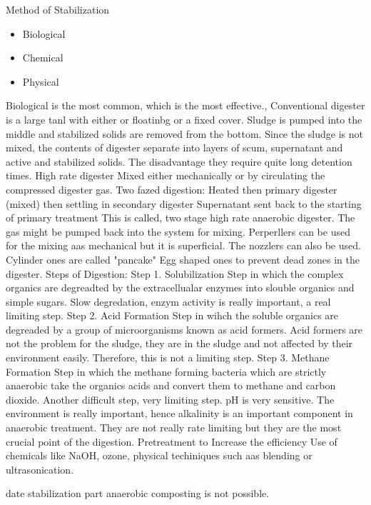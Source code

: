 \documentclass[12pt]{article}
\begin{document}
Method of Stabilization
\begin{itemize}
    \item Biological
    \item Chemical
    \item Physical
\end{itemize}
Biological is the most common, which is the most effective.,
Conventional digester  %
is a large tanl with either or floatinbg or a fixed cover. Sludge is pumped into the middle and stabilized solids are removed from the bottom. Since the sludge is not mixed, the contents of digester separate into layers of scum, supernatant and active and stabilized solids. The disadvantage they require quite long detention times.
High rate digester %
Mixed either mechanically or by circulating the compressed digester gas.
Two fazed digestion:
Heated then primary digester (mixed) then settling in secondary digester
Supernatant sent back to the starting of primary treatment
This is called, two stage high rate anaerobic digester.
The gas might be pumped back into the system for mixing.
Perperllers can be used for the mixing aas mechanical but it is superficial.
The nozzlers can also be used.
Cylinder ones are called "pancake"
Egg shaped ones to prevent dead zones in the digester.
Steps of Digestion:
Step 1. Solubilization Step in which the complex organics are degreadted by the extracellualar enzymes into slouble organics and simple sugars. Slow degredation, enzym activity is really important, a real limiting step. %
Step 2. Acid Formation Step in wihch  the soluble organics are degreaded by a group of microorganisms known as acid formers.
Acid formers are not the problem for the sludge, they are in the sludge and not affected by their environment easily. Therefore, this is not a limiting step.
Step 3. Methane Formation Step in which the methane forming bacteria which are strictly anaerobic take the organics acids and convert them to methane and carbon dioxide. Another difficult step, very limiting step. pH is very sensitive. The environment is really important, hence alkalinity is an important component in anaerobic treatment. They are not really rate limiting but they are the most crucial point of the digestion. %
Pretreatment to Increase the efficiency
Use of chemicals like NaOH, ozone, physical techiniques such aas blending or ultrasonication.

date
stabilization part
anaerobic composting is not possible.
\end{document}
